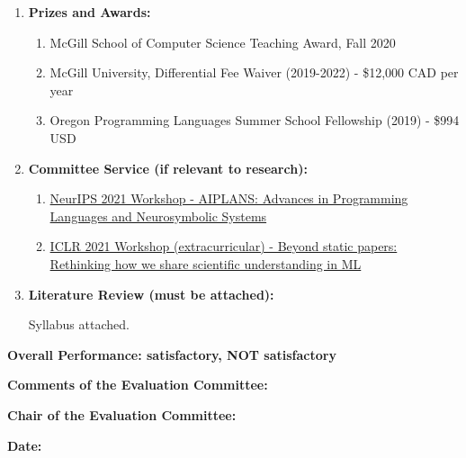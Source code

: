 \documentclass[11pt]{article}
\begin{document}
\begin{enumerate}
        \item \textbf{Prizes and Awards:}

        \begin{enumerate}
            \item McGill School of Computer Science Teaching Award, Fall 2020
            \item McGill University, Differential Fee Waiver (2019-2022) - \$12,000 CAD per year
            \item Oregon Programming Languages Summer School Fellowship (2019) - \$994 USD
        \end{enumerate}

        \item \textbf{Committee Service (if relevant to research):}

        \begin{enumerate}
            \item \href{https://aiplans.github.io/}{NeurIPS 2021 Workshop - AIPLANS: Advances in Programming Languages and Neurosymbolic Systems}
            \item \href{https://newpapers.github.io/}{ICLR 2021 Workshop (extracurricular) - Beyond static papers: Rethinking how we share scientific understanding in ML}
        \end{enumerate}

        \item \textbf{Literature Review  (must be attached):}

        Syllabus attached.

    \end{enumerate}

    \bigskip

    \newpage
    \textbf{Overall Performance: \qquad satisfactory\underline{\hspace{20mm}},
    \qquad NOT satisfactory\underline{\hspace{20mm}}}

    \bigskip
    \textbf{Comments of the Evaluation Committee:}

    \bigskip

    \vspace{100mm}


    \textbf{Chair of the  Evaluation Committee:}
    \bigskip

    \textbf{Date:} %
\end{document}
